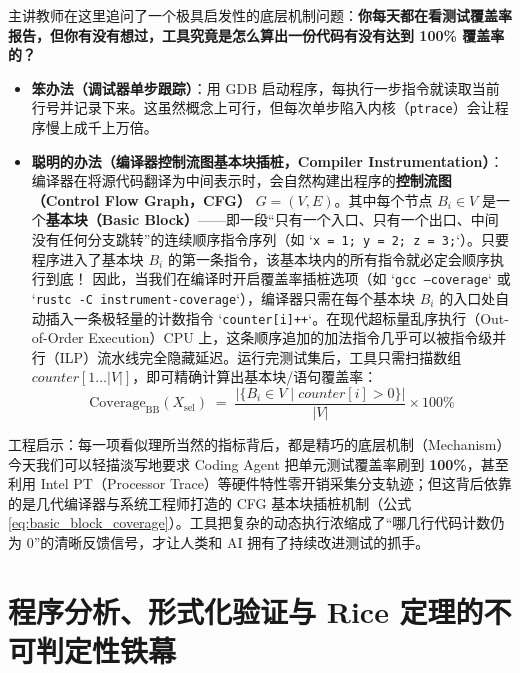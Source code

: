 \documentclass[a4paper]{article}
\begin{document}
主讲教师在这里追问了一个极具启发性的底层机制问题：\textbf{你每天都在看测试覆盖率报告，但你有没有想过，工具究竟是怎么算出一份代码有没有达到 100\% 覆盖率的？}
\begin{itemize}
    \item \textbf{笨办法（调试器单步跟踪）}：用 GDB 启动程序，每执行一步指令就读取当前行号并记录下来。这虽然概念上可行，但每次单步陷入内核（\texttt{ptrace}）会让程序慢上成千上万倍。
    \item \textbf{聪明的办法（编译器控制流图基本块插桩，Compiler Instrumentation）}：编译器在将源代码翻译为中间表示时，会自然构建出程序的\textbf{控制流图（Control Flow Graph，CFG）} $G = (V, E)$。其中每个节点 $B_i \in V$ 是一个\textbf{基本块（Basic Block）}——即一段“只有一个入口、只有一个出口、中间没有任何分支跳转”的连续顺序指令序列（如 `\texttt{x = 1; y = 2; z = 3;}`）。只要程序进入了基本块 $B_i$ 的第一条指令，该基本块内的所有指令就必定会顺序执行到底！
    因此，当我们在编译时开启覆盖率插桩选项（如 `\texttt{gcc --coverage}` 或 `\texttt{rustc -C instrument-coverage}`），编译器只需在每个基本块 $B_i$ 的入口处自动插入一条极轻量的计数指令 `\texttt{counter[i]++}`。在现代超标量乱序执行（Out-of-Order Execution）CPU 上，这条顺序追加的加法指令几乎可以被指令级并行（ILP）流水线完全隐藏延迟。运行完测试集后，工具只需扫描数组 $\mathit{counter}[1\dots |V|]$，即可精确计算出基本块/语句覆盖率：
    \begin{equation}
    \mathrm{Coverage}_{\text{BB}}(X_{\text{sel}}) \;=\; \frac{\big|\{ B_i \in V \mid \mathit{counter}[i] > 0 \}\big|}{|V|} \times 100\%
    \label{eq:basic_block_coverage}
    \end{equation}
\end{itemize}

\begin{knowledgebox}{工程启示：每一项看似理所当然的指标背后，都是精巧的底层机制（Mechanism）}
今天我们可以轻描淡写地要求 Coding Agent 把单元测试覆盖率刷到 \textbf{100\%}，甚至利用 Intel PT（Processor Trace）等硬件特性零开销采集分支轨迹；但这背后依靠的是几代编译器与系统工程师打造的 CFG 基本块插桩机制（公式 \eqref{eq:basic_block_coverage}）。工具把复杂的动态执行浓缩成了“哪几行代码计数仍为 $0$”的清晰反馈信号，才让人类和 AI 拥有了持续改进测试的抓手。
\end{knowledgebox}

\section{程序分析、形式化验证与 Rice 定理的不可判定性铁幕}
\end{document}
